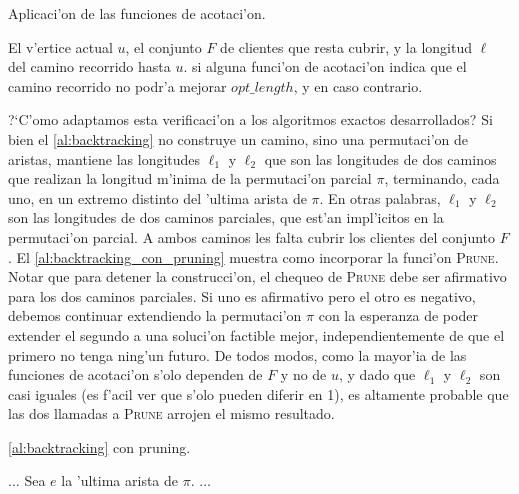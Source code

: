 \begin{algorithm}
  \caption{Aplicaci'on de las funciones de acotaci'on.}
  \label{al:prune}
  \begin{algorithmic}[1]
  	\Require El v'ertice actual $u$, el conjunto $F$ de clientes que resta cubrir, y la longitud $\ell$ del camino recorrido hasta $u$.
  	\Ensure \True si alguna funci'on de acotaci'on indica que el camino recorrido no podr'a mejorar $opt\_length$, y \False en caso contrario.
			\Return \True
		\EndIf
	\EndFor
	\Return \False
	\EndFunction
  \end{algorithmic}
\end{algorithm}

?`C'omo adaptamos esta verificaci'on a los algoritmos exactos desarrollados? Si bien el \autoref{al:backtracking} no construye un camino, sino una permutaci'on de aristas, mantiene las longitudes $\ell_1$ y $\ell_2$ que son las longitudes de dos caminos que realizan la longitud m'inima de la permutaci'on parcial $\pi$, terminando, cada uno, en un extremo distinto del 'ultima arista de $\pi$. En otras palabras, $\ell_1$ y $\ell_2$ son las longitudes de dos caminos parciales, que est'an impl'icitos en la permutaci'on parcial. A ambos caminos les falta cubrir los clientes del conjunto $F$. El \autoref{al:backtracking_con_pruning} muestra como incorporar la funci'on \textsc{Prune}. Notar que para detener la construcci'on, el chequeo de \textsc{Prune} debe ser afirmativo para los dos caminos parciales. Si uno es afirmativo pero el otro es negativo, debemos continuar extendiendo la permutaci'on $\pi$ con la esperanza de poder extender el segundo a una soluci'on factible mejor, independientemente de que el primero no tenga ning'un futuro. De todos modos, como la mayor'ia de las funciones de acotaci'on s'olo dependen de $F$ y no de $u$, y dado que $\ell_1$ y $\ell_2$ son casi iguales (es f'acil ver que s'olo pueden diferir en 1), es altamente probable que las dos llamadas a \textsc{Prune} arrojen el mismo resultado.

\begin{algorithm}
  \caption{\autoref{al:backtracking} con pruning.}
  \label{al:backtracking_con_pruning}
  \begin{algorithmic}[1]
		\State $\dots$
	\EndIf
	\State Sea $e$ la 'ultima arista de $\pi$.
		\Return
	\EndIf
		\State $\dots$
	\EndFor
	\EndFunction
  \end{algorithmic}
\end{algorithm}

